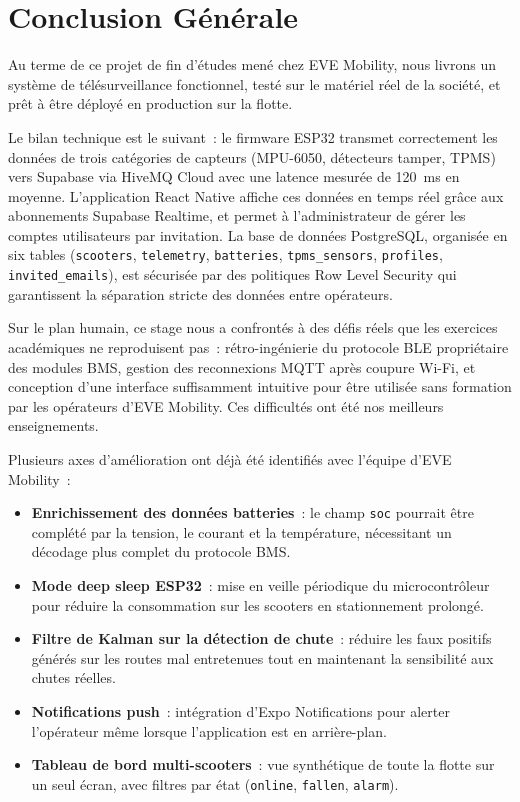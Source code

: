 \documentclass[12pt, a4paper]{report}
\begin{document}
\chapter*{Conclusion Générale}
\thispagestyle{fancy}

Au terme de ce projet de fin d'études mené chez EVE Mobility, nous livrons un système
de télésurveillance fonctionnel, testé sur le matériel réel de la société, et prêt à
être déployé en production sur la flotte.

Le bilan technique est le suivant~: le firmware ESP32 transmet correctement les données
de trois catégories de capteurs (MPU-6050, détecteurs tamper, TPMS) vers Supabase via
HiveMQ Cloud avec une latence mesurée de 120~ms en moyenne. L'application React Native
affiche ces données en temps réel grâce aux abonnements Supabase Realtime, et permet
à l'administrateur de gérer les comptes utilisateurs par invitation. La base de données
PostgreSQL, organisée en six tables (\texttt{scooters}, \texttt{telemetry},
\texttt{batteries}, \texttt{tpms\_sensors}, \texttt{profiles}, \texttt{invited\_emails}),
est sécurisée par des politiques Row Level Security qui garantissent la séparation
stricte des données entre opérateurs.

Sur le plan humain, ce stage nous a confrontés à des défis réels que les exercices
académiques ne reproduisent pas~: rétro-ingénierie du protocole BLE propriétaire des
modules BMS, gestion des reconnexions MQTT après coupure Wi-Fi, et conception d'une
interface suffisamment intuitive pour être utilisée sans formation par les opérateurs
d'EVE Mobility. Ces difficultés ont été nos meilleurs enseignements.

Plusieurs axes d'amélioration ont déjà été identifiés avec l'équipe d'EVE Mobility~:

\begin{itemize}
  \item \textbf{Enrichissement des données batteries}~: le champ \texttt{soc} pourrait
        être complété par la tension, le courant et la température, nécessitant un
        décodage plus complet du protocole BMS.
  \item \textbf{Mode deep sleep ESP32}~: mise en veille périodique du microcontrôleur
        pour réduire la consommation sur les scooters en stationnement prolongé.
  \item \textbf{Filtre de Kalman sur la détection de chute}~: réduire les faux
        positifs générés sur les routes mal entretenues tout en maintenant la
        sensibilité aux chutes réelles.
  \item \textbf{Notifications push}~: intégration d'Expo Notifications pour alerter
        l'opérateur même lorsque l'application est en arrière-plan.
  \item \textbf{Tableau de bord multi-scooters}~: vue synthétique de toute la flotte
        sur un seul écran, avec filtres par état (\texttt{online}, \texttt{fallen},
        \texttt{alarm}).
\end{itemize}
\end{document}
